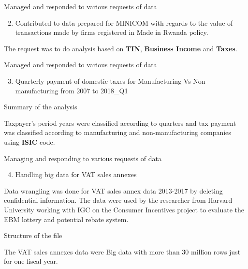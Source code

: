 \documentclass[ignorenonframetext,]{beamer}
\providecommand{\tightlist}{%
  \setlength{\itemsep}{0pt}\setlength{\parskip}{0pt}}
\begin{document}
\begin{frame}{Managed and responded to various requests of data}
\protect\hypertarget{managed-and-responded-to-various-requests-of-data-1}{}

\begin{enumerate}
\setcounter{enumi}{1}
\tightlist
\item
  Contributed to data prepared for MINICOM with regards to the value of
  transactions made by firms registered in Made in Rwanda policy.
\end{enumerate}

The request was to do analysis based on \textbf{TIN},
\textbf{Business Income} and \textbf{Taxes}.

\end{frame}

\begin{frame}{Managed and responded to various requests of data}
\protect\hypertarget{managed-and-responded-to-various-requests-of-data-2}{}

\begin{enumerate}
[1)]
\setcounter{enumi}{2}
\tightlist
\item
  Quarterly payment of domestic taxes for Manufacturing Vs
  Non-manufacturing from 2007 to 2018\_Q1
\end{enumerate}

\begin{block}{Summary of the analysis}

Taxpayer's period years were classified according to quarters and tax
payment was classified according to manufacturing and non-manufacturing
companies using \textbf{ISIC} code.

\end{block}

\end{frame}

\begin{frame}{Managing and responding to various requests of data}
\protect\hypertarget{managing-and-responding-to-various-requests-of-data}{}

\begin{enumerate}
[1)]
\setcounter{enumi}{3}
\tightlist
\item
  Handling big data for VAT sales annexes
\end{enumerate}

Data wrangling was done for VAT sales annex data 2013-2017 by deleting
confidential information. The data were used by the researcher from
Harvard University working with IGC on the Consumer Incentives project
to evaluate the EBM lottery and potential rebate system.

\begin{block}{Structure of the file}

The VAT sales annexes data were Big data with more than 30 million rows
just for one fiscal year.

\end{block}

\end{frame}
\end{document}
